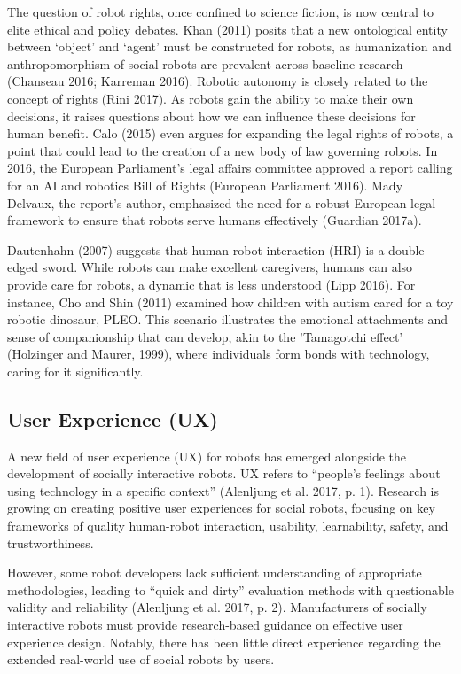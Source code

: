 The question of robot rights, once confined to science fiction, is now central to elite ethical and policy debates. Khan (2011) posits that a new ontological entity between ‘object’ and ‘agent’ must be constructed for robots, as humanization and anthropomorphism of social robots are prevalent across baseline research (Chanseau 2016; Karreman 2016). Robotic autonomy is closely related to the concept of rights (Rini 2017). As robots gain the ability to make their own decisions, it raises questions about how we can influence these decisions for human benefit. Calo (2015) even argues for expanding the legal rights of robots, a point that could lead to the creation of a new body of law governing robots. In 2016, the European Parliament's legal affairs committee approved a report calling for an AI and robotics Bill of Rights (European Parliament 2016). Mady Delvaux, the report's author, emphasized the need for a robust European legal framework to ensure that robots serve humans effectively (Guardian 2017a).

Dautenhahn (2007) suggests that human-robot interaction (HRI) is a double-edged sword. While robots can make excellent caregivers, humans can also provide care for robots, a dynamic that is less understood (Lipp 2016). For instance, Cho and Shin (2011) examined how children with autism cared for a toy robotic dinosaur, PLEO. This scenario illustrates the emotional attachments and sense of companionship that can develop, akin to the 'Tamagotchi effect' (Holzinger and Maurer, 1999), where individuals form bonds with technology, caring for it significantly.

\subsection{User Experience (UX)}

A new field of user experience (UX) for robots has emerged alongside the development of socially interactive robots. UX refers to “people’s feelings about using technology in a specific context” (Alenljung et al. 2017, p. 1). Research is growing on creating positive user experiences for social robots, focusing on key frameworks of quality human-robot interaction, usability, learnability, safety, and trustworthiness.

However, some robot developers lack sufficient understanding of appropriate methodologies, leading to “quick and dirty” evaluation methods with questionable validity and reliability (Alenljung et al. 2017, p. 2). Manufacturers of socially interactive robots must provide research-based guidance on effective user experience design. Notably, there has been little direct experience regarding the extended real-world use of social robots by users.

